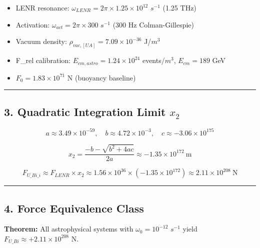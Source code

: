 \documentclass[
  11pt,
]{article}
\providecommand{\tightlist}{%
  \setlength{\itemsep}{0pt}\setlength{\parskip}{0pt}}
\begin{document}
\begin{itemize}
\tightlist
\item
  LENR resonance: \(\omega_{LENR} = 2\pi \times 1.25 \times 10^{12}\)
  \(s^{-1}\) (1.25 THz)
\item
  Activation: \(\omega_{act} = 2\pi \times 300\) \(s^{-1}\) (300 Hz
  Colman-Gillespie)
\item
  Vacuum density: \(\rho_{vac,[UA]} = 7.09 \times 10^{-36}\) J/\(m^3\)
\item
  F\_rel calibration: \(E_{cm,astro} = 1.24 \times 10^{24}\)
  events/\(m^3\), \(E_{cm} = 189\) GeV
\item
  \(F_0 = 1.83 \times 10^{71}\) N (buoyancy baseline)
\end{itemize}

\begin{center}\rule{0.5\linewidth}{0.5pt}\end{center}

\subsection{\texorpdfstring{3. Quadratic Integration Limit
\(x_2\)}{3. Quadratic Integration Limit x\_2}}\label{quadratic-integration-limit-x_2}

\[a \approx 3.49\times10^{-59},\quad b \approx 4.72\times10^{-3},\quad c \approx -3.06\times10^{175}\]

\[x_2 = \frac{-b - \sqrt{b^2 + 4ac}}{2a} \approx -1.35\times10^{172}\ \mathrm{m}\]

\[\boxed{F_{U\_Bi\_i} \approx F_{LENR} \times x_2 \approx 1.56\times10^{36} \times (-1.35\times10^{172}) \approx 2.11\times10^{208}\ \mathrm{N}}\]

\begin{center}\rule{0.5\linewidth}{0.5pt}\end{center}

\subsection{4. Force Equivalence Class}\label{force-equivalence-class}

\textbf{Theorem:} All astrophysical systems with \(\omega_0 = 10^{-12}\)
\(s^{-1}\) yield \(F_{U\_Bi} \approx +2.11 \times 10^{208}\) N.
\end{document}
